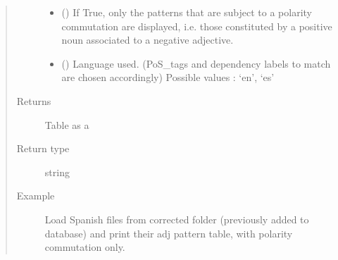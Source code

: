 \documentclass[letterpaper,10pt,english]{sphinxmanual}
\begin{document}
\begin{fulllineitems}
\begin{quote}
\begin{description}
\begin{itemize}
\item {} 
 () \textendash{} If True, only the patterns that are subject to a polarity commutation are displayed, i.e. those constituted by a
positive noun associated to a negative adjective.

\item {} 
 () \textendash{} Language used. (PoS\_tags and dependency labels to match are chosen accordingly) Possible values : ‘en’, ‘es’

\end{itemize}

\item[{Returns}] \leavevmode
Table as a 

\item[{Return type}] \leavevmode
string

\item[{Example}] \leavevmode
Load Spanish files from corrected folder (previously added to database) and print their adj pattern table, with
polarity commutation only.

%
\begin{sphinxVerbatim}[commandchars=\\\{\}]
   
   
  \PYG{p}{[}\PYG{p}{]}
  
   
     
\end{sphinxVerbatim}

\end{description}\end{quote}

\end{fulllineitems}
\end{document}
